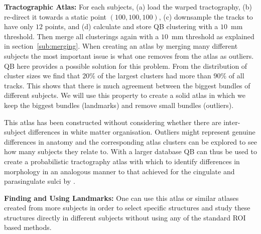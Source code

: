 \documentclass[preprint,authoryear,a4paper,10pt,onecolumn]{elsarticle}
\begin{document}
\textbf{Tractographic Atlas:} For each subjects, (a) load the warped
tractography, (b) re-direct it towards a static point $(100,100,100)$, 
(c) downsample the tracks to have only $12$ points, and (d) calculate
and store QB clustering with a $10$~mm threshold. Then merge all
clusterings again with a $10$~mm threshold as explained in
section~\ref{sub:merging}. When creating an atlas by merging
many different subjects the most important issue is what one removes
from the atlas as outliers.  QB here provides a possible solution for
this problem. From the distribution of cluster sizes we find that $20\%$
of the largest clusters had more than $90\%$ of all tracks. This shows
that there is much agreement between the biggest bundles of different
subjects.  We will use this property to create a solid atlas in which we
keep the biggest bundles (landmarks) and remove small bundles
(outliers).



This atlas has been constructed without considering whether there are
inter-subject differences in white matter organisation. Outliers might
represent genuine differences in anatomy and the corresponding atlas
clusters can be explored to see how many subjects they relate to. With a
larger database QB can thus be used to create a probabilistic
tractography atlas with which to identify differences in morphology in
an analogous manner to that achieved for the cingulate and parasingulate
sulci by \citet{paus1996human}.

\textbf{Finding and Using Landmarks:} One can use this atlas or similar
atlases created from more subjects in order to select specific
structures and study these structures directly in different subjects
without using any of the standard ROI based methods.
\end{document}
